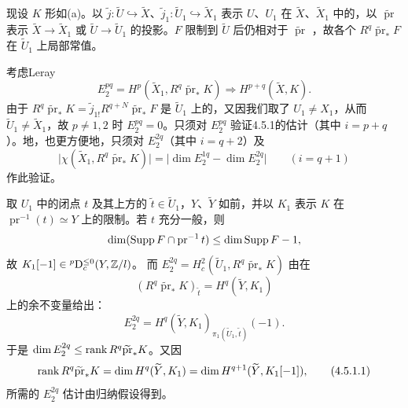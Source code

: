 现设 $K$ 形如(a)。以 $\tilde j:\widetilde U\hookrightarrow\widetilde X$、$\tilde j_1:\widetilde U_1\hookrightarrow\widetilde X_1$ 表示 $U$、$U_1$ 在 $\widetilde X$、$\widetilde X_1$ 中的，以 $\widetilde{\operatorname{pr}}$ 表示 $\widetilde X\to\widetilde X_1$ 或 $\widetilde U\to\widetilde U_1$ 的投影。$F$ 限制到 $\widetilde U$ 后仍相对于 $\widetilde{\operatorname{pr}}$ ，故各个 $R^q\widetilde{\operatorname{pr}}_*F$ 在 $\widetilde U_1$ 上局部常值。

考虑Leray
\[E_2^{pq}=H^p(\widetilde X_1,R^q\widetilde{\operatorname{pr}}_*K)\Longrightarrow H^{p+q}(\widetilde X,K).\]
由于 $R^q\widetilde{\operatorname{pr}}_*K=\tilde j_{1!}R^{q+N}\widetilde{\operatorname{pr}}_*F$ 是 $\widetilde U_1$ 上的，又因我们取了 $U_1\ne X_1$，从而 $\widetilde U_1\ne\widetilde X_1$，故 $p\ne1,2$ 时 $E_2^{pq}=0$。只须对 $E_2^{pq}$ 验证4.5.1的估计（其中 $i=p+q$）。地，也更方便地，只须对 $E_2^{2q}$（其中 $i=q+2$）及
\[\bigl|\chi(\widetilde X_1,R^q\widetilde{\operatorname{pr}}_*K)\bigr|=\bigl|\dim E_2^{1q}-\dim E_2^{2q}\bigr|\qquad(i=q+1)\]
作此验证。

取 $U_1$ 中的闭点 $t$ 及其上方的 $\tilde t\in\widetilde U_1$，$Y$、$\widetilde Y$ 如前，并以 $K_1$ 表示 $K$ 在 $\operatorname{pr}^{-1}(t)\simeq Y$ 上的限制。若 $t$ 充分一般，则
\[\dim(\operatorname{Supp} F\cap\operatorname{pr}^{-1}t)\le\dim\operatorname{Supp} F-1,\]
故 $K_1[-1]\in{}^p\mathrm{D}_c^{\le0}(Y,\mathbb Z/l)$。
而 $E_2^{2q}=H_c^2(\widetilde U_1,R^q\widetilde{\operatorname{pr}}_*K)$ 由在
\[(R^q\widetilde{\operatorname{pr}}_*K)_{\tilde t}=H^q(\widetilde Y,K_1)\]
上的余不变量给出：
\[E_2^{2q}=H^q(\widetilde Y,K_1)_{\pi_1(\widetilde U_1,\tilde t)}(-1).\]
于是 $\dim E_2^{2q}\le\operatorname{rank} R^q\widetilde{\operatorname{pr}}_*K$。又因
\begin{equation*}\operatorname{rank} R^q\widetilde{\operatorname{pr}}_*K=\dim H^q(\widetilde Y,K_1)=\dim H^{q+1}(\widetilde Y,K_1[-1]),\tag{4.5.1.1}\end{equation*}
所需的 $E_2^{2q}$ 估计由归纳假设得到。

